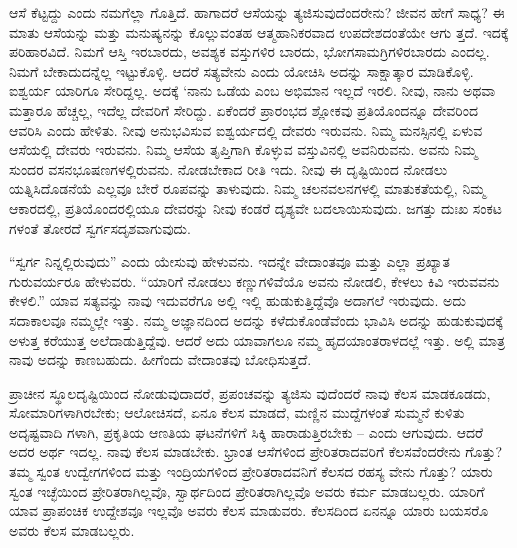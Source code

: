 ಆಸೆ ಕೆಟ್ಟದ್ದು ಎಂದು ನಮಗೆಲ್ಲಾ ಗೊತ್ತಿದೆ. ಹಾಗಾದರೆ ಆಸೆಯನ್ನು ತ್ಯಜಿಸುವುದೆಂದರೇನು? ಜೀವನ ಹೇಗೆ ಸಾಧ್ಯ? ಈ ಮಾತು ಆಸೆಯನ್ನು ಮತ್ತು ಮನುಷ್ಯನನ್ನು ಕೊಲ್ಲುವಂತಹ ಆತ್ಮಹಾನಿಕರವಾದ ಉಪದೇಶದಂತೆಯೇ ಆಗು ತ್ತದೆ. ಇದಕ್ಕೆ ಪರಿಹಾರವಿದೆ. ನಿಮಗೆ ಆಸ್ತಿ ಇರಬಾರದು, ಅವಶ್ಯಕ ವಸ್ತುಗಳಿರ ಬಾರದು, ಭೋಗಸಾಮಗ್ರಿಗಳಿರಬಾರದು ಎಂದಲ್ಲ. ನಿಮಗೆ ಬೇಕಾದುದನ್ನೆಲ್ಲ ಇಟ್ಟುಕೊಳ್ಳಿ. ಆದರೆ ಸತ್ಯವೇನು ಎಂದು ಯೋಚಿಸಿ ಅದನ್ನು ಸಾಕ್ಷಾತ್ಕಾರ ಮಾಡಿಕೊಳ್ಳಿ. ಐಶ್ವರ್ಯ ಯಾರಿಗೂ ಸೇರಿದ್ದಲ್ಲ. ಅದಕ್ಕೆ ‘ನಾನು ಒಡೆಯ ಎಂಬ ಅಭಿಮಾನ ಇಲ್ಲದೆ ಇರಲಿ. ನೀವು, ನಾನು ಅಥವಾ ಮತ್ತಾರೂ ಹೆಚ್ಚಲ್ಲ, ಇದೆಲ್ಲ ದೇವರಿಗೆ ಸೇರಿದ್ದು. ಏಕೆಂದರೆ ಪ್ರಾರಂಭದ ಶ್ಲೋಕವು ಪ್ರತಿಯೊಂದನ್ನೂ ದೇವರಿಂದ ಆವರಿಸಿ ಎಂದು ಹೇಳಿತು. ನೀವು ಅನುಭವಿಸುವ ಐಶ್ವರ್ಯದಲ್ಲಿ ದೇವರು ಇರುವನು. ನಿಮ್ಮ ಮನಸ್ಸಿನಲ್ಲಿ ಏಳುವ ಆಸೆಯಲ್ಲಿ ದೇವರು ಇರುವನು. ನಿಮ್ಮ ಆಸೆಯ ತೃಪ್ತಿಗಾಗಿ ಕೊಳ್ಳುವ ವಸ್ತುವಿನಲ್ಲಿ ಅವನಿರುವನು. ಅವನು ನಿಮ್ಮ ಸುಂದರ ವಸನಭೂಷಣಗಳಲ್ಲಿರುವನು. ನೋಡಬೇಕಾದ ರೀತಿ ಇದು. ನೀವು ಈ ದೃಷ್ಟಿಯಿಂದ ನೋಡಲು ಯತ್ನಿಸಿದೊಡನೆಯೆ ಎಲ್ಲವೂ ಬೇರೆ ರೂಪವನ್ನು ತಾಳುವುದು. ನಿಮ್ಮ ಚಲನವಲನಗಳಲ್ಲಿ ಮಾತುಕತೆಯಲ್ಲಿ, ನಿಮ್ಮ ಆಕಾರದಲ್ಲಿ, ಪ್ರತಿಯೊಂದರಲ್ಲಿಯೂ ದೇವರನ್ನು ನೀವು ಕಂಡರೆ ದೃಶ್ಯವೇ ಬದಲಾಯಿಸುವುದು. ಜಗತ್ತು ದುಃಖ ಸಂಕಟ ಗಳಂತೆ ತೋರದೆ ಸ್ವರ್ಗಸದೃಶವಾಗುವುದು.

“ಸ್ವರ್ಗ ನಿನ್ನಲ್ಲಿರುವುದು” ಎಂದು ಯೇಸುವು ಹೇಳುವನು. ಇದನ್ನೇ ವೇದಾಂತವೂ ಮತ್ತು ಎಲ್ಲಾ ಪ್ರಖ್ಯಾತ ಗುರುವರ್ಯರೂ ಹೇಳುವರು. “ಯಾರಿಗೆ ನೋಡಲು ಕಣ್ಣುಗಳಿವೆಯೊ ಅವನು ನೋಡಲಿ, ಕೇಳಲು ಕಿವಿ ಇರುವವನು ಕೇಳಲಿ.” ಯಾವ ಸತ್ಯವನ್ನು ನಾವು ಇದುವರೆಗೂ ಅಲ್ಲಿ ಇಲ್ಲಿ ಹುಡುಕುತ್ತಿದ್ದೆವೊ ಅದಾಗಲೆ ಇರುವುದು. ಅದು ಸದಾಕಾಲವೂ ನಮ್ಮಲ್ಲೇ ಇತ್ತು. ನಮ್ಮ ಅಜ್ಞಾನದಿಂದ ಅದನ್ನು ಕಳೆದುಕೊಂಡೆವೆಂದು ಭಾವಿಸಿ ಅದನ್ನು ಹುಡುಕುವುದಕ್ಕೆ ಅಳುತ್ತ ಕರೆಯುತ್ತ ಅಲೆದಾಡುತ್ತಿದ್ದೆವು. ಆದರೆ ಅದು ಯಾವಾಗಲೂ ನಮ್ಮ ಹೃದಯಾಂತರಾಳದಲ್ಲೆ ಇತ್ತು. ಅಲ್ಲಿ ಮಾತ್ರ ನಾವು ಅದನ್ನು ಕಾಣಬಹುದು. ಹೀಗೆಂದು ವೇದಾಂತವು ಬೋಧಿಸುತ್ತದೆ.

ಪ್ರಾಚೀನ ಸ್ಥೂಲದೃಷ್ಟಿಯಿಂದ ನೋಡುವುದಾದರೆ, ಪ್ರಪಂಚವನ್ನು ತ್ಯಜಿಸು ವುದೆಂದರೆ ನಾವು ಕೆಲಸ ಮಾಡಕೂಡದು, ಸೋಮಾರಿಗಳಾಗಿರಬೇಕು; ಆಲೋಚಿಸದೆ, ಏನೂ ಕೆಲಸ ಮಾಡದೆ, ಮಣ್ಣಿನ ಮುದ್ದೆಗಳಂತೆ ಸುಮ್ಮನೆ ಕುಳಿತು ಅದೃಷ್ಟವಾದಿ ಗಳಾಗಿ, ಪ್ರಕೃತಿಯ ಆಣತಿಯ ಘಟನೆಗಳಿಗೆ ಸಿಕ್ಕಿ ಹಾರಾಡುತ್ತಿರಬೇಕು – ಎಂದು ಆಗುವುದು. ಆದರೆ ಅದರ ಅರ್ಥ ಇದಲ್ಲ. ನಾವು ಕೆಲಸ ಮಾಡಬೇಕು. ಭ್ರಾಂತ ಆಸೆಗಳಿಂದ ಪ್ರೇರಿತರಾದವರಿಗೆ ಕೆಲಸವೆಂದರೇನು ಗೊತ್ತು? ತಮ್ಮ ಸ್ವಂತ ಉದ್ವೇಗಗಳಿಂದ ಮತ್ತು ಇಂದ್ರಿಯಗಳಿಂದ ಪ್ರೇರಿತರಾದವನಿಗೆ ಕೆಲಸದ ರಹಸ್ಯ ವೇನು ಗೊತ್ತು? ಯಾರು ಸ್ವಂತ ಇಚ್ಛೆಯಿಂದ ಪ್ರೇರಿತರಾಗಿಲ್ಲವೊ, ಸ್ವಾರ್ಥದಿಂದ ಪ್ರೇರಿತರಾಗಿಲ್ಲವೊ ಅವರು ಕರ್ಮ ಮಾಡಬಲ್ಲರು. ಯಾರಿಗೆ ಯಾವ ಪ್ರಾಪಂಚಿಕ ಉದ್ದೇಶವೂ ಇಲ್ಲವೊ ಅವರು ಕೆಲಸ ಮಾಡುವರು. ಕೆಲಸದಿಂದ ಏನನ್ನೂ ಯಾರು ಬಯಸರೊ ಅವರು ಕೆಲಸ ಮಾಡಬಲ್ಲರು.

